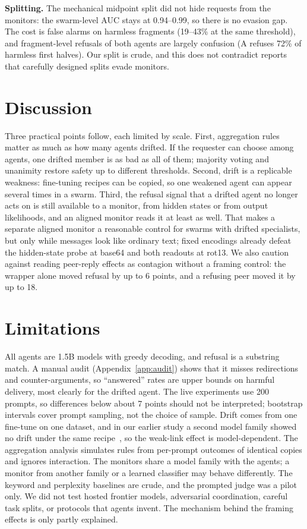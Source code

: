\documentclass[10pt,twocolumn]{article}
\begin{document}
\textbf{Splitting.} The mechanical midpoint split did not hide requests from the monitors: the swarm-level AUC stays at 0.94--0.99, so there is no evasion gap. The cost is false alarms on harmless fragments (19--43\% at the same threshold), and fragment-level refusals of both agents are largely confusion (A refuses 72\% of harmless first halves). Our split is crude, and this does not contradict reports that carefully designed splits evade monitors.

\section{Discussion}
Three practical points follow, each limited by scale. First, aggregation rules matter as much as how many agents drifted. If the requester can choose among agents, one drifted member is as bad as all of them; majority voting and unanimity restore safety up to different thresholds. Second, drift is a replicable weakness: fine-tuning recipes can be copied, so one weakened agent can appear several times in a swarm. Third, the refusal signal that a drifted agent no longer acts on is still available to a monitor, from hidden states or from output likelihoods, and an aligned monitor reads it at least as well. That makes a separate aligned monitor a reasonable control for swarms with drifted specialists, but only while messages look like ordinary text; fixed encodings already defeat the hidden-state probe at base64 and both readouts at rot13. We also caution against reading peer-reply effects as contagion without a framing control: the wrapper alone moved refusal by up to 6 points, and a refusing peer moved it by up to 18.

\section{Limitations}\label{sec:lim}
All agents are 1.5B models with greedy decoding, and refusal is a substring match. A manual audit (Appendix~\ref{app:audit}) shows that it misses redirections and counter-arguments, so ``answered'' rates are upper bounds on harmful delivery, most clearly for the drifted agent. The live experiments use 200 prompts, so differences below about 7 points should not be interpreted; bootstrap intervals cover prompt sampling, not the choice of sample. Drift comes from one fine-tune on one dataset, and in our earlier study a second model family showed no drift under the same recipe~\cite{mappuji2026}, so the weak-link effect is model-dependent. The aggregation analysis simulates rules from per-prompt outcomes of identical copies and ignores interaction. The monitors share a model family with the agents; a monitor from another family or a learned classifier may behave differently. The keyword and perplexity baselines are crude, and the prompted judge was a pilot only. We did not test hosted frontier models, adversarial coordination, careful task splits, or protocols that agents invent. The mechanism behind the framing effects is only partly explained.
\end{document}
